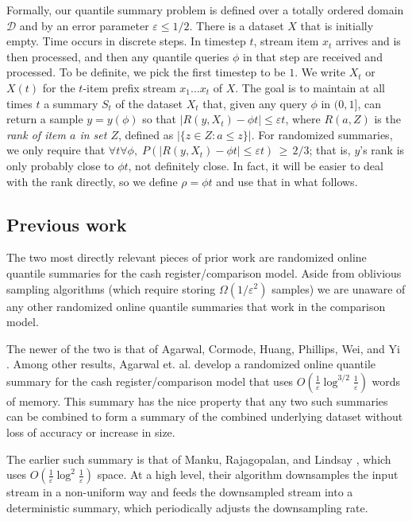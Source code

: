 \documentclass{article}
\theoremstyle{plain}
\def\ep{\varepsilon}
\def\DD{\mathcal{D}}
\newcommand{\p}[1]{(#1)}
\newcommand{\pc}[1]{\{#1\}}
\newcommand{\abs}[1]{|#1|}
\newcommand{\setc}[2]{\pc{#1 : #2}}
\renewcommand{\P}[1]{P\p{#1}}
\newcommand{\OO}[1]{O\p{#1}}
\newcommand{\OT}[1]{\Omega\p{#1}}
\newcommand{\rank}[2]{R\p{#1,#2}}
\begin{document}
Formally, our quantile summary problem is defined over a totally ordered domain
$\DD$ and by an error parameter $\ep \le 1/2$. There is a dataset $X$ that is
initially empty. Time occurs in discrete steps. In timestep $t$, stream item
$x_t$ arrives and is then processed, and then any quantile queries $\phi$ in
that step are received and processed. To be definite, we pick the first timestep
to be $1$. We write $X_t$ or $X(t)$ for the $t$-item prefix stream $x_1 \ldots
x_t$ of $X$. The goal is to maintain at all times $t$ a summary $S_t$ of the
dataset $X_t$ that, given any query $\phi$ in $(0, 1]$, can return a sample $y =
  y\p{\phi}$ so that $\abs{\rank{y}{X_t} - \phi t} \le \ep t$, where
  $\rank{a}{Z}$ is the \emph{rank of item $a$ in set $Z$}, defined as
  $\abs{\setc{z \in Z}{a \le z}}$. For randomized summaries, we only require
  that $\forall t \forall \phi,\; \P{\abs{\rank{y}{X_t} - \phi t} \le \ep t}
  \,\ge\, 2/3$; that is, $y$'s rank is only probably close to $\phi t$, not
  definitely close. In fact, it will be easier to deal with the rank directly,
  so we define $\rho = \phi t$ and use that in what follows.



\subsection{Previous work}

The two most directly relevant pieces of prior work are randomized online
quantile summaries for the cash register/comparison model. Aside from oblivious
sampling algorithms (which require storing $\OT{1/\ep^2}$ samples) we are
unaware of any other randomized online quantile summaries that work in the
comparison model.

The newer of the two is that of Agarwal, Cormode, Huang, Phillips, Wei, and Yi
\cite{ACHPWY2012} \cite{ACHPWY2013}. Among other results, Agarwal et. al.
develop a randomized online quantile summary for the cash register/comparison
model that uses $\OO{\frac{1}{\ep} \log^{3/2} \frac{1}{\ep}}$ words of memory.
This summary has the nice property that any two such summaries can be combined
to form a summary of the combined underlying dataset without loss of accuracy or
increase in size.

The earlier such summary is that of Manku, Rajagopalan, and Lindsay
\cite{MRL1999}, which uses $\OO{\frac{1}{\ep} \log^2 \frac{1}{\ep}}$ space. At a
high level, their algorithm downsamples the input stream in a non-uniform way
and feeds the downsampled stream into a deterministic summary, which
periodically adjusts the downsampling rate.
\end{document}
